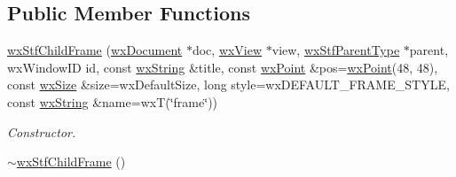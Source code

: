 \subsection*{Public Member Functions}
\begin{DoxyCompactItemize}
\item 
\hyperlink{classwxStfChildFrame_ad0da3136456c372aac1a26264a05cf88}{wxStfChildFrame} (\hyperlink{classwxDocument}{wxDocument} $\ast$doc, \hyperlink{classwxView}{wxView} $\ast$view, \hyperlink{classwxDocMDIParentFrame}{wxStfParentType} $\ast$parent, wxWindowID id, const \hyperlink{classwxString}{wxString} \&title, const \hyperlink{classwxPoint}{wxPoint} \&pos=\hyperlink{classwxPoint}{wxPoint}(48, 48), const \hyperlink{classwxSize}{wxSize} \&size=wxDefaultSize, long style=wxDEFAULT\_\-FRAME\_\-STYLE, const \hyperlink{classwxString}{wxString} \&name=wxT(\char`\"{}frame\char`\"{}))
\begin{DoxyCompactList}\small\item\em Constructor. \item\end{DoxyCompactList}\item 
\hypertarget{classwxStfChildFrame_ab4d598cb9650ba0734aa9c9a82b1e6a6}{
\hyperlink{classwxStfChildFrame_ab4d598cb9650ba0734aa9c9a82b1e6a6}{$\sim$wxStfChildFrame} ()}
\label{classwxStfChildFrame_ab4d598cb9650ba0734aa9c9a82b1e6a6}


\end{DoxyCompactItemize}
